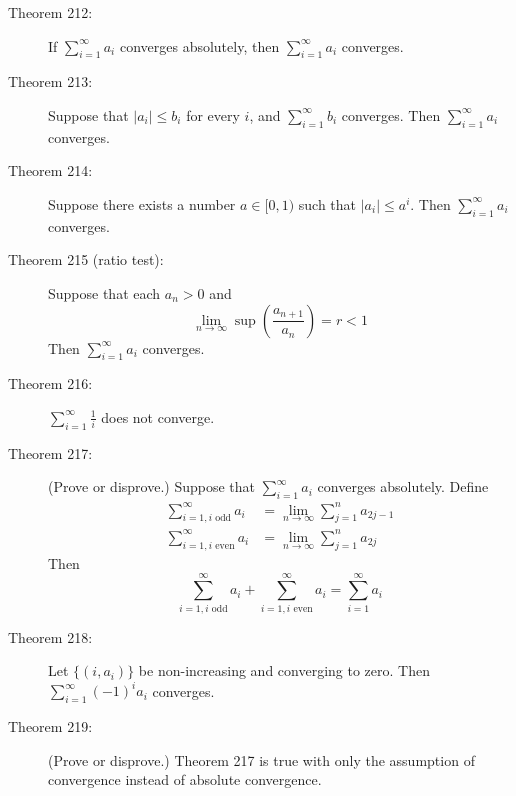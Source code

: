 \documentclass{article}
\begin{document}
\begin{description}
  \item[Theorem 212:] If $\displaystyle \sum_{i=1}^{\infty} a_{i}$ converges absolutely, then $\displaystyle \sum_{i=1}^{\infty} a_{i}$ converges. 

  \item[Theorem 213:] Suppose that $|a_{i}| \leq b_{i}$ for every $i$, and $\displaystyle \sum_{i=1}^{\infty} b_{i}$ converges. Then $\displaystyle \sum_{i=1}^{\infty} a_{i}$ converges. 

  \item[Theorem 214:] Suppose there exists a number $a \in [0,1)$ such that $|a_{i}| \leq a^{i}$. Then $\displaystyle \sum_{i=1}^{\infty}a_{i}$ converges.

  \item[Theorem 215 (ratio test):] Suppose that each $a_{n} > 0$ and
    \begin{equation*}
    \lim_{n \rightarrow \infty} \sup \left( \frac{a_{n+1}}{a_{n}} \right) = r < 1
    \end{equation*}
    Then $\displaystyle \sum_{i=1}^{\infty} a_{i}$ converges.

  \item[Theorem 216:] $\displaystyle \sum_{i=1}^{\infty} \frac{1}{i}$ does not converge.

  \item[Theorem 217:] (Prove or disprove.) Suppose that $\displaystyle \sum_{i=1}^{\infty} a_{i}$ converges absolutely. Define
    \begin{align*}
      \sum_{i=1, i \text{ odd} }^{\infty} a_{i} & = \lim_{n \rightarrow \infty} \sum_{j=1}^{n} a_{2j-1} \\
      \sum_{i=1, i \text{ even} }^{\infty} a_{i} & = \lim_{n \rightarrow \infty} \sum_{j=1}^{n} a_{2j}
    \end{align*}
    Then
    \begin{equation*}
      \sum_{i=1, i \text{ odd} }^{\infty} a_{i} + \sum_{i=1, i \text{ even} }^{\infty} a_{i} = \sum_{i=1}^{\infty} a_{i}
    \end{equation*}

  \item[Theorem 218:] Let $\{ (i, a_{i}) \}$ be non-increasing and converging to zero. Then $\displaystyle \sum_{i=1}^{\infty} (-1)^{i} a_{i}$ converges.

  \item[Theorem 219:] (Prove or disprove.) Theorem 217 is true with only the assumption of convergence instead of absolute convergence.


\end{description}
\end{document}
